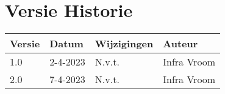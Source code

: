 \section*{Versie Historie} 

\begin{table}[h]
\begin{tabular}{|l|l|l|l|}
\hline
\rowcolor[HTML]{4472C4} 
{\color[HTML]{FFFFFF} \textbf{Versie}} &
  {\color[HTML]{FFFFFF} \textbf{Datum}} &
  {\color[HTML]{FFFFFF} \textbf{Wijzigingen}} &
  {\color[HTML]{FFFFFF} \textbf{Auteur}} \\ \hline
\rowcolor[HTML]{D9E1F2} 
1.0 &
  \multicolumn{1}{c|}{\cellcolor[HTML]{D9E1F2}2-4-2023} &
 N.v.t. &
  Infra   Vroom \\ \hline

\rowcolor[HTML]{FFFFFF} 
2.0 &
  \multicolumn{1}{c|}{\cellcolor[HTML]{FFFFFF}7-4-2023} &
 N.v.t. &
  Infra   Vroom \\ \hline

  
\end{tabular}
\end{table}